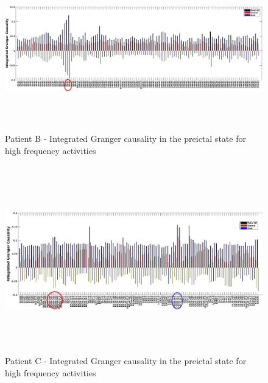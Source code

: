 \begin{figure}
\centerline{
	\includegraphics[height =2.8in]{Plots/Patient_B_preictal_high.jpg}
	}

	\caption{Patient B - Integrated Granger causality in the preictal state for high frequency activities}

	\label{fig:apdx_patient_b_preictal_high}
\end{figure}

\begin{figure}
\centerline{
	\includegraphics[height =3.2in]{Plots/Patient_C_preictal_high.jpg}
	}

	\caption{Patient C - Integrated Granger causality in the preictal state for high frequency activities}

	\label{fig:apdx_patient_c_preictal_high}
\end{figure}



